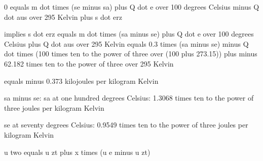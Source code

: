 0 equals m dot times (se minus sa) plus Q dot e over 100 degrees Celsius minus Q dot aus over 295 Kelvin plus s dot erz

implies s dot erz equals m dot times (sa minus se) plus Q dot e over 100 degrees Celsius plus Q dot aus over 295 Kelvin equals 0.3 times (sa minus se) minus Q dot times (100 times ten to the power of three over (100 plus 273.15)) plus minus 62.182 times ten to the power of three over 295 Kelvin

equals minus 0.373 kilojoules per kilogram Kelvin

sa minus se: sa at one hundred degrees Celsius: 1.3068 times ten to the power of three joules per kilogram Kelvin

se at seventy degrees Celsius: 0.9549 times ten to the power of three joules per kilogram Kelvin

u two equals u zt plus x times (u e minus u zt)
